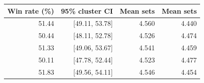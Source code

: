 \begin{tabular}{rrrr}
\toprule
Win rate (\%) & 95\% cluster CI & Mean sets \vsix{} & Mean sets \vfive{} \\
\midrule
51.44 & [49.11, 53.78] & 4.560 & 4.440 \\
50.44 & [48.11, 52.78] & 4.526 & 4.474 \\
51.33 & [49.06, 53.67] & 4.541 & 4.459 \\
50.11 & [47.78, 52.44] & 4.523 & 4.477 \\
51.83 & [49.56, 54.11] & 4.546 & 4.454 \\
\bottomrule
\end{tabular}
